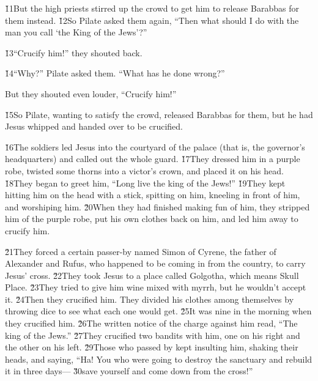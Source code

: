 \v{11}But the high priests stirred up the crowd to get him to release Barabbas for them instead. \v{12}So Pilate asked them again, ``Then what should I do with the man you call `the King of the Jews'?''

\v{13}``Crucify him!'' they shouted back.

\v{14}``Why?'' Pilate asked them. ``What has he done wrong?''

But they shouted even louder, ``Crucify him!''

\v{15}So Pilate, wanting to satisfy the crowd, released Barabbas for them, but he had Jesus whipped and handed over to be crucified.

\v{16}The soldiers led Jesus into the courtyard of the palace (that is, the governor's headquarters) and called out the whole guard. \v{17}They dressed him in a purple robe, twisted some thorns into a victor's crown, and placed it on his head. \v{18}They began to greet him, ``Long live the king of the Jews!'' \v{19}They kept hitting him on the head with a stick, spitting on him, kneeling in front of him, and worshiping him. \v{20}When they had finished making fun of him, they stripped him of the purple robe, put his own clothes back on him, and led him away to crucify him.

\v{21}They forced a certain passer-by named Simon of Cyrene, the father of Alexander and Rufus, who happened to be coming in from the country, to carry Jesus' cross. \v{22}They took Jesus to a place called Golgotha, which means Skull Place. \v{23}They tried to give him wine mixed with myrrh, but he wouldn't accept it. \v{24}Then they crucified him. They divided his clothes among themselves by throwing dice to see what each one would get. \v{25}It was nine in the morning when they crucified him. \v{26}The written notice of the charge against him read, ``The king of the Jews.'' \v{27}They crucified two bandits with him, one on his right and the other on his left. \v{29}Those who passed by kept insulting him, shaking their heads, and saying, ``Ha! You who were going to destroy the sanctuary and rebuild it in three days--- \v{30}save yourself and come down from the cross!''

